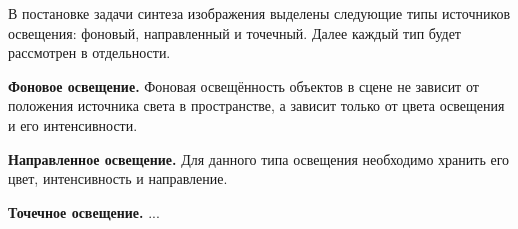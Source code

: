В постановке задачи синтеза изображения выделены следующие типы источников освещения: фоновый, направленный и точечный. Далее каждый тип будет рассмотрен в отдельности.

\textbf{Фоновое освещение.} Фоновая освещённость объектов в сцене не зависит от положения источника света в пространстве, а зависит только от цвета освещения и его интенсивности.

\textbf{Направленное освещение.} Для данного типа освещения необходимо хранить его цвет, интенсивность и направление.

\textbf{Точечное освещение.} ...

